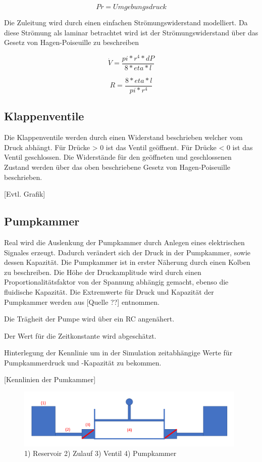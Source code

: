 \documentclass[fontsize=12pt, a4paper]{scrartcl}
\begin{document}
\[ Pr = Umgebungsdruck \]

Die Zuleitung wird durch einen einfachen Strömungswiderstand modelliert. Da diese Strömung als laminar betrachtet wird ist der Strömungswiderstand über das Gesetz von Hagen-Poiseuille zu beschreiben

\begin{equation}
	\dot{V} = \frac{pi * r^4 * dP}{8* eta *l}
\end{equation}

\begin{equation}
	R = \frac{8* eta *l}{pi * r^4}
\end{equation}

\subsection{Klappenventile}

Die Klappenventile werden durch einen Widerstand beschrieben welcher vom Druck abhängt. Für Drücke > 0 ist das Ventil geöffnent. Für Drücke < 0 ist das Ventil geschlossen. Die Widerstände für den geöffneten und geschlossenen Zustand werden über das oben beschriebene Gesetz von Hagen-Poiseuille beschrieben.

[Evtl. Grafik]

\subsection{Pumpkammer}
Real wird die Auslenkung der Pumpkammer durch Anlegen eines elektrischen Signales erzeugt. Dadurch verändert sich der Druck in der Pumpkammer, sowie dessen Kapazität. Die Pumpkammer ist in erster Näherung durch einen Kolben zu beschreiben. Die Höhe der Druckamplitude wird durch einen Proportionalitätsfaktor von der Spannung abhängig gemacht, ebenso die fluidische Kapazität. Die Extremwerte für Druck und Kapazität der Pumpkammer werden aus [Quelle ??] entnommen.

Die Trägheit der Pumpe wird über ein RC angenähert.

Der Wert für die Zeitkonstante wird abgeschätzt.

Hinterlegung der Kennlinie um in der Simulation zeitabhängige Werte für Pumpkammerdruck und -Kapazität zu bekommen.

[Kennlinien der Pumkammer]

\begin{figure}[H]
	\centering
	\includegraphics[width=0.98\textwidth]{bilder/theorie/pumpe_prinzipskizze.PNG}
	\caption{1) Reservoir 2) Zulauf 3) Ventil 4) Pumpkammer}
\end{figure}
\end{document}
